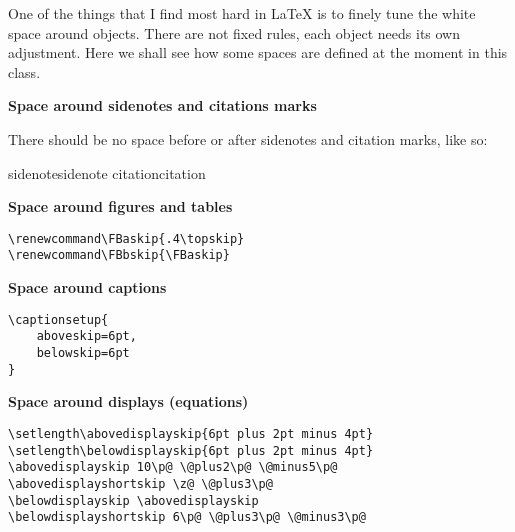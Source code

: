 One of the things that I find most hard in \LaTeX\xspace is to finely
tune the white space around objects. There are not fixed rules, each
object needs its own adjustment. Here we shall see how some spaces are
defined at the moment in this class.

\textbf{Space around sidenotes and citations marks}

There should be no space before or after sidenotes and citation marks,
like so:

sidenotesidenote\newline
citation\cite{James2013}citation

\textbf{Space around figures and tables}

\begin{lstlisting}[style=kaolstplain]
\renewcommand\FBaskip{.4\topskip}
\renewcommand\FBbskip{\FBaskip}
\end{lstlisting}

\textbf{Space around captions}

\begin{lstlisting}[style=kaolstplain]
\captionsetup{
	aboveskip=6pt,
	belowskip=6pt
}
\end{lstlisting}

\textbf{Space around displays (\eg equations)}

\begin{lstlisting}[style=kaolstplain]
\setlength\abovedisplayskip{6pt plus 2pt minus 4pt}
\setlength\belowdisplayskip{6pt plus 2pt minus 4pt}
\abovedisplayskip 10\p@ \@plus2\p@ \@minus5\p@
\abovedisplayshortskip \z@ \@plus3\p@
\belowdisplayskip \abovedisplayskip
\belowdisplayshortskip 6\p@ \@plus3\p@ \@minus3\p@
\end{lstlisting}
